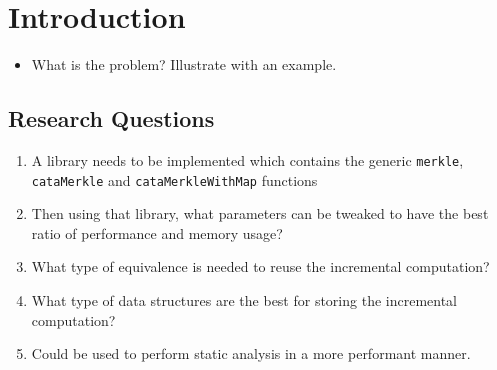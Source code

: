 \section{Introduction}
\begin{itemize}
    \item What is the problem? Illustrate with an example.
\end{itemize}


\subsection{Research Questions}
\begin{enumerate}[label={(\Alph*)}]
    \item A library needs to be implemented which contains the generic \texttt{merkle}, \texttt{cataMerkle} and \texttt{cataMerkleWithMap} functions
    \item Then using that library, what parameters can be tweaked to have the best ratio of performance and memory usage?
    \item What type of equivalence is needed to reuse the incremental computation?
    \item What type of data structures are the best for storing the incremental computation?
    \item Could be used to perform static analysis in a more performant manner.
\end{enumerate}